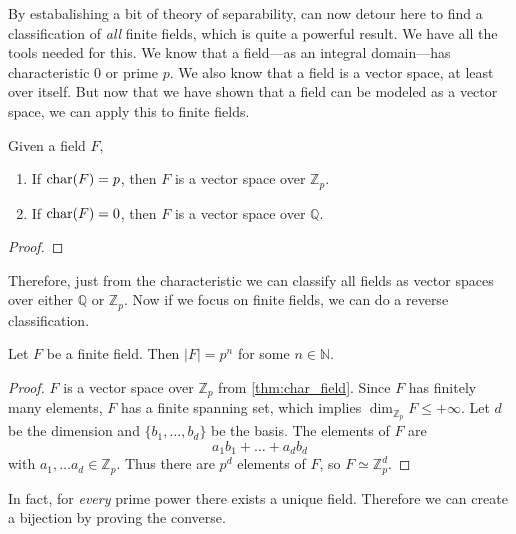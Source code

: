   By estabalishing a bit of theory of separability, can now detour here to find a classification of \textit{all} finite fields, which is quite a powerful result. We have all the tools needed for this. We know that a field---as an integral domain---has characteristic $0$ or prime $p$. We also know that a field is a vector space, at least over itself. But now that we have shown that a field can be modeled as a vector space, we can apply this to finite fields. 

  \begin{theorem}
    \label{thm:char_field}
    Given a field $F$, 
    \begin{enumerate}
      \item If $\Char(F) = p$, then $F$ is a vector space over $\mathbb{Z}_p$. 
      \item If $\Char(F) = 0$, then $F$ is a vector space over $\mathbb{Q}$. 
    \end{enumerate}
  \end{theorem}
  \begin{proof}
    
  \end{proof} 

  Therefore, just from the characteristic we can classify all fields as vector spaces over either $\mathbb{Q}$ or $\mathbb{Z}_p$. Now if we focus on finite fields, we can do a reverse classification. 

  \begin{theorem}
    Let $F$ be a finite field. Then $|F| = p^n$ for some $n \in \mathbb{N}$. 
  \end{theorem}
  \begin{proof}
    $F$ is a vector space over $\mathbb{Z}_p$ from \ref{thm:char_field}. Since $F$ has finitely many elements, $F$ has a finite spanning set, which implies $\dim_{\mathbb{Z}_p} F \leq + \infty$. Let $d$ be the dimension and $\{b_1, \ldots, b_d\}$ be the basis. The elements of $F$ are 
    \begin{equation}
      a_1 b_1 + \ldots + a_d b_d
    \end{equation}
    with $a_1, \ldots a_d \in \mathbb{Z}_p$. Thus there are $p^d$ elements of $F$, so $F \simeq \mathbb{Z}_p^d$. 
  \end{proof}

  In fact, for \textit{every} prime power there exists a unique field. Therefore we can create a bijection by proving the converse. 

